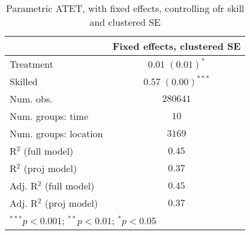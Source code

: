 
\begin{table}
\caption{Parametric ATET, with fixed effects, controlling ofr skill and clustered SE}
\begin{center}
\begin{tabular}{l c}
\hline
 & Fixed effects, clustered SE \\
\hline
Treatment               & $0.01 \; (0.01)^{*}$   \\
Skilled                 & $0.57 \; (0.00)^{***}$ \\
\hline
Num. obs.               & $280641$               \\
Num. groups: time       & $10$                   \\
Num. groups: location   & $3169$                 \\
R$^2$ (full model)      & $0.45$                 \\
R$^2$ (proj model)      & $0.37$                 \\
Adj. R$^2$ (full model) & $0.45$                 \\
Adj. R$^2$ (proj model) & $0.37$                 \\
\hline
\multicolumn{2}{l}{\scriptsize{$^{***}p<0.001$; $^{**}p<0.01$; $^{*}p<0.05$}}
\end{tabular}
\label{table:coefficients}
\end{center}
\end{table}
